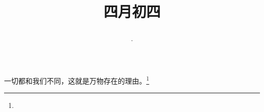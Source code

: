 \title{\date[d=11,m=5,y=2024][year:cn-y,年,month:cn,day:cn,日,·,weekday]·四月初四 }
一切都和我们不同，这就是万物存在的理由。\footnote{ }

